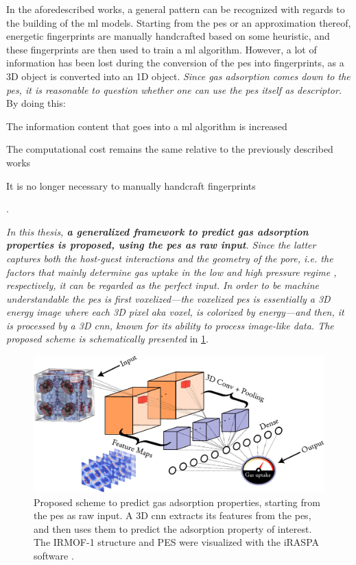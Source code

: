 In the aforedescribed works, a general pattern can be recognized with regards to
the building of the \gls{ml} models. Starting from the \gls{pes} or an approximation thereof, energetic fingerprints are manually
handcrafted based on some heuristic, and these fingerprints are then used to
train a \gls{ml} algorithm. However, a lot of information has been lost during
the conversion of the \gls{pes} into fingerprints, as a 3D object is converted
into an 1D object.  \emph{Since gas adsorption comes down to the \gls{pes}, it
is reasonable to question whether one can use the \gls{pes} itself as
descriptor}. By doing this:
\begin{enumerate*}
	\item The information content that goes into a \gls{ml} algorithm is increased
	\item The computational cost remains the same relative
		to the previously described works
	\item It is no longer necessary to manually handcraft fingerprints
\end{enumerate*}.

\emph{In this thesis, \textbf{a generalized framework to predict gas adsorption
properties is proposed, using the \gls{pes} as raw input}. Since the latter captures
both the host-guest interactions and the geometry of the pore, i.e. the factors
that mainly determine gas uptake in the low and high pressure regime
\parencite{concepts}, respectively, it can be regarded as the perfect input. In
order to be machine understandable the \gls{pes} is first voxelized---the
voxelized \gls{pes} is essentially a 3D energy image where
each 3D pixel aka voxel, is colorized by energy---and then, it is processed by a
3D \gls{cnn}, known for its ability to process image-like data. The proposed
scheme is schematically presented} in \Figure{} \ref{fig:approach}.

\begin{figure}
	\centering
	\includegraphics[width=\textwidth]{fig/approach.pdf}
	\caption[Generalized framework to predict gas adsorption
	properties.]{Proposed scheme to predict gas adsorption properties, starting
	from the \gls{pes} as raw input. A 3D \gls{cnn} extracts its
	features from the \gls{pes}, and then uses them to predict
	the adsorption property of interest. The IRMOF-1 structure and PES were
	visualized with the iRASPA software \parencite{Dubbeldam2018}.}
	\label{fig:approach}
\end{figure}
